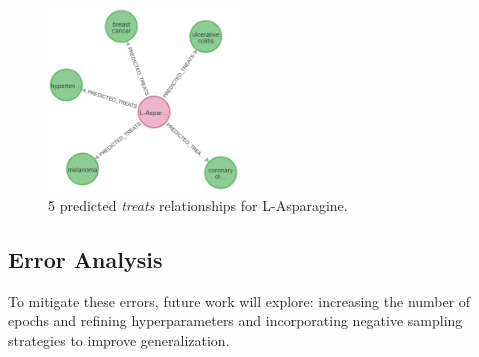 \begin{figure}[ht]
    \centering
    \includegraphics[width=0.45\textwidth]{images/pykeen/predicted treats.png}
    \caption{5 predicted \textit{treats} relationships for L-Asparagine.}
    \label{fig:predicted_treats}
\end{figure}

\subsection*{Error Analysis}


To mitigate these errors, future work will explore: increasing the number of epochs and refining hyperparameters and incorporating negative sampling strategies to improve generalization.
